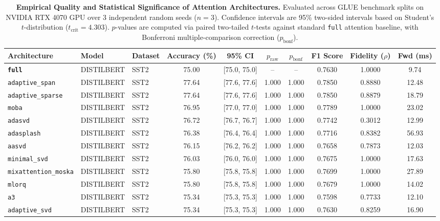 \begin{table}[t]
\centering
\small
\caption{\textbf{Empirical Quality and Statistical Significance of Attention Architectures.} Evaluated across GLUE benchmark splits on NVIDIA RTX 4070 GPU over 3 independent random seeds ($n=3$). Confidence intervals are 95\% two-sided intervals based on Student's $t$-distribution ($t_{\text{crit}}=4.303$). $p$-values are computed via paired two-tailed $t$-tests against standard \texttt{full} attention baseline, with Bonferroni multiple-comparison correction ($p_{\text{bonf}}$).}
\label{tab:quality_benchmark_results}
\begin{tabular}{l l l c c c c c c c}
\toprule
\textbf{Architecture} & \textbf{Model} & \textbf{Dataset} & \textbf{Accuracy (\%)} & \textbf{95\% CI} & \textbf{$p_{\text{raw}}$} & \textbf{$p_{\text{bonf}}$} & \textbf{F1 Score} & \textbf{Fidelity ($\rho$)} & \textbf{Fwd (ms)} \\
\midrule
\textbf{\texttt{full}} & DISTILBERT & SST2 & 75.00 & [75.0, 75.0] & -- & -- & 0.7630 & 1.0000 & 9.74 \\
\texttt{adaptive\_span} & DISTILBERT & SST2 & 77.64 & [77.6, 77.6] & 1.000 & 1.000 & 0.7850 & 0.8880 & 12.48 \\
\texttt{adaptive\_sparse} & DISTILBERT & SST2 & 77.64 & [77.6, 77.6] & 1.000 & 1.000 & 0.7850 & 0.8879 & 18.79 \\
\texttt{moba} & DISTILBERT & SST2 & 76.95 & [77.0, 77.0] & 1.000 & 1.000 & 0.7789 & 1.0000 & 23.02 \\
\texttt{adasvd} & DISTILBERT & SST2 & 76.72 & [76.7, 76.7] & 1.000 & 1.000 & 0.7742 & 0.3012 & 12.99 \\
\texttt{adasplash} & DISTILBERT & SST2 & 76.38 & [76.4, 76.4] & 1.000 & 1.000 & 0.7716 & 0.8382 & 56.93 \\
\texttt{aasvd} & DISTILBERT & SST2 & 76.15 & [76.2, 76.2] & 1.000 & 1.000 & 0.7658 & 0.7873 & 12.03 \\
\texttt{minimal\_svd} & DISTILBERT & SST2 & 76.03 & [76.0, 76.0] & 1.000 & 1.000 & 0.7675 & 1.0000 & 17.63 \\
\texttt{mixattention\_moska} & DISTILBERT & SST2 & 75.80 & [75.8, 75.8] & 1.000 & 1.000 & 0.7699 & 1.0000 & 27.89 \\
\texttt{mlorq} & DISTILBERT & SST2 & 75.80 & [75.8, 75.8] & 1.000 & 1.000 & 0.7679 & 1.0000 & 14.02 \\
\texttt{a3} & DISTILBERT & SST2 & 75.34 & [75.3, 75.3] & 1.000 & 1.000 & 0.7598 & 0.7733 & 12.10 \\
\texttt{adaptive\_svd} & DISTILBERT & SST2 & 75.34 & [75.3, 75.3] & 1.000 & 1.000 & 0.7630 & 0.8259 & 16.90 \\

\end{tabular}
\end{table}
